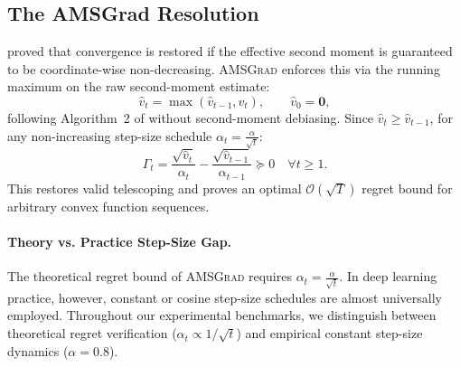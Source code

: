 \subsection{The AMSGrad Resolution}
\citet{reddi2018convergence} proved that convergence is restored if the effective second moment is guaranteed to be coordinate-wise non-decreasing. \textsc{AMSGrad} enforces this via the running maximum on the raw second-moment estimate:
\begin{equation}
    \hat{v}_t = \max\left(\hat{v}_{t-1}, v_t\right), \qquad \hat{v}_0 = \mathbf{0},
    \label{eq:amsgrad_max}
\end{equation}
following Algorithm~2 of \citet{reddi2018convergence} without second-moment debiasing. Since $\hat{v}_t \ge \hat{v}_{t-1}$, for any non-increasing step-size schedule $\alpha_t = \frac{\alpha}{\sqrt{t}}$:
\begin{equation}
    \Gamma_t = \frac{\sqrt{\hat{v}_t}}{\alpha_t} - \frac{\sqrt{\hat{v}_{t-1}}}{\alpha_{t-1}} \succeq 0 \quad \forall t \ge 1.
\end{equation}
This restores valid telescoping and proves an optimal $\mathcal{O}(\sqrt{T})$ regret bound for arbitrary convex function sequences.

\paragraph{Theory vs. Practice Step-Size Gap.} The theoretical regret bound of \textsc{AMSGrad} requires $\alpha_t = \frac{\alpha}{\sqrt{t}}$. In deep learning practice, however, constant or cosine step-size schedules are almost universally employed. Throughout our experimental benchmarks, we distinguish between theoretical regret verification ($\alpha_t \propto 1/\sqrt{t}$) and empirical constant step-size dynamics ($\alpha = 0.8$).

